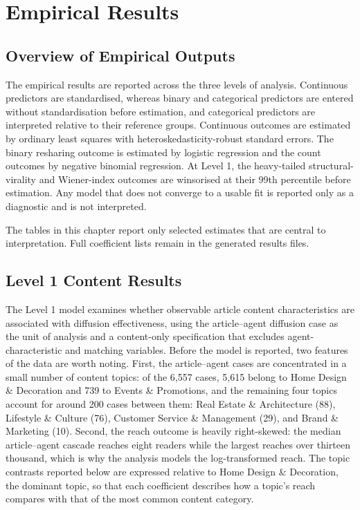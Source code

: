 ﻿\chapter{Empirical Results}
\label{chap:empirical-results}

\section{Overview of Empirical Outputs}
\label{sec:6-1-overview-of-empirical-outputs}

The empirical results are reported across the three levels of analysis. Continuous predictors are standardised, whereas binary and categorical predictors are entered without standardisation before estimation, and categorical predictors are interpreted relative to their reference groups. Continuous outcomes are estimated by ordinary least squares with heteroskedasticity-robust standard errors. The binary resharing outcome is estimated by logistic regression and the count outcomes by negative binomial regression. At Level 1, the heavy-tailed structural-virality and Wiener-index outcomes are winsorised at their 99th percentile before estimation. Any model that does not converge to a usable fit is reported only as a diagnostic and is not interpreted.

The tables in this chapter report only selected estimates that are central to interpretation. Full coefficient lists remain in the generated results files.

\section{Level 1 Content Results}
\label{sec:6-2-level-1-content-results}

The Level 1 model examines whether observable article content characteristics are associated with diffusion effectiveness, using the article–agent diffusion case as the unit of analysis and a content-only specification that excludes agent-characteristic and matching variables. Before the model is reported, two features of the data are worth noting. First, the article–agent cases are concentrated in a small number of content topics: of the 6,557 cases, 5,615 belong to Home Design \& Decoration and 739 to Events \& Promotions, and the remaining four topics account for around 200 cases between them: Real Estate \& Architecture (88), Lifestyle \& Culture (76), Customer Service \& Management (29), and Brand \& Marketing (10). Second, the reach outcome is heavily right-skewed: the median article–agent cascade reaches eight readers while the largest reaches over thirteen thousand, which is why the analysis models the log-transformed reach. The topic contrasts reported below are expressed relative to Home Design \& Decoration, the dominant topic, so that each coefficient describes how a topic's reach compares with that of the most common content category.

